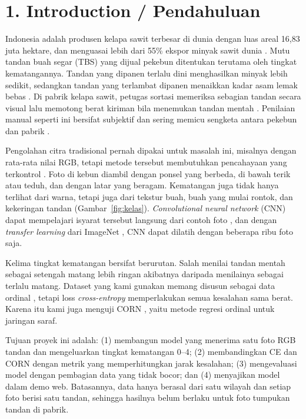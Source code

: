 \documentclass[10pt,a4paper,twocolumn]{article}
\begin{document}
\section{1. Introduction / Pendahuluan}
Indonesia adalah produsen kelapa sawit terbesar di dunia dengan luas areal 16,83 juta hektare, dan menguasai lebih dari 55\% ekspor minyak sawit dunia \cite{pusdatin2024}. Mutu tandan buah segar (TBS) yang dijual pekebun ditentukan terutama oleh tingkat kematangannya. Tandan yang dipanen terlalu dini menghasilkan minyak lebih sedikit, sedangkan tandan yang terlambat dipanen menaikkan kadar asam lemak bebas \cite{woittiez2016}. Di pabrik kelapa sawit, petugas sortasi memeriksa sebagian tandan secara visual lalu memotong berat kiriman bila menemukan tandan mentah \cite{woittiez2016}. Penilaian manual seperti ini bersifat subjektif dan sering memicu sengketa antara pekebun dan pabrik \cite{alfatni2008}.

Pengolahan citra tradisional pernah dipakai untuk masalah ini, misalnya dengan rata-rata nilai RGB, tetapi metode tersebut membutuhkan pencahayaan yang terkontrol \cite{alfatni2008}. Foto di kebun diambil dengan ponsel yang berbeda, di bawah terik atau teduh, dan dengan latar yang beragam. Kematangan juga tidak hanya terlihat dari warna, tetapi juga dari tekstur buah, buah yang mulai rontok, dan kekeringan tandan (Gambar~\ref{fig:kelas}). \emph{Convolutional neural network} (CNN) dapat mempelajari isyarat tersebut langsung dari contoh foto \cite{suharjito2021}, dan dengan \emph{transfer learning} dari ImageNet \cite{deng2009}, CNN dapat dilatih dengan beberapa ribu foto saja.

Kelima tingkat kematangan bersifat berurutan. Salah menilai tandan mentah sebagai setengah matang lebih ringan akibatnya daripada menilainya sebagai terlalu matang. Dataset yang kami gunakan memang disusun sebagai data ordinal \cite{kamal2024}, tetapi loss \emph{cross-entropy} memperlakukan semua kesalahan sama berat. Karena itu kami juga menguji CORN \cite{shi2023}, yaitu metode regresi ordinal untuk jaringan saraf.

Tujuan proyek ini adalah: (1) membangun model yang menerima satu foto RGB tandan dan mengeluarkan tingkat kematangan 0--4; (2) membandingkan CE dan CORN dengan metrik yang memperhitungkan jarak kesalahan; (3) mengevaluasi model dengan pembagian data yang tidak bocor; dan (4) menyajikan model dalam demo web. Batasannya, data hanya berasal dari satu wilayah dan setiap foto berisi satu tandan, sehingga hasilnya belum berlaku untuk foto tumpukan tandan di pabrik.
\end{document}
